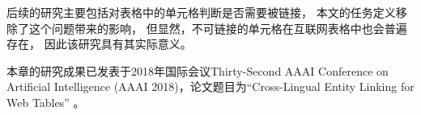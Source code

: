 后续的研究主要包括对表格中的单元格判断是否需要被链接，
本文的任务定义移除了这个问题带来的影响，
但显然，不可链接的单元格在互联网表格中也会普遍存在，
因此该研究具有其实际意义。


本章的研究成果已发表于2018年国际会议Thirty-Second AAAI Conference on Artificial Intelligence
(AAAI 2018)，论文题目为``Cross-Lingual Entity Linking for Web Tables'' 。
